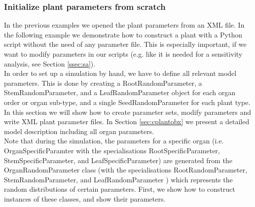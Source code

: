 \subsubsection*{Initialize plant parameters from scratch} 
 
In the previous examples we opened the plant parameters from an XML file. In the following example we demonstrate how to construct a plant with a Python script without the need of any parameter file. This is especially important, if we want to modify parameters in our scripts (e.g. like it is needed for a sensitivity analysis, see Section \ref{ssec:sa}). \\

In order to set up a simulation by hand, we have to define all relevant model parameters. This is done by creating a RootRandomParameter, a StemRandomParameter, and a LeafRandomParameter object for each organ order or organ sub-type, and a single SeedRandomParameter for each plant type. In this section we will show how to create parameter sets, modify parameters and write XML plant parameter files. In Section \ref{sec:cplantobx} we present a detailed model description including all organ parameters. \\

Note that during the simulation, the parameters for a specific organ (i.e. OrganSpecificParamter with the specialisations RootSpecificParameter, StemSpecificParameter, and LeafSpecificParameter) are generated from the OrganRandomParameter class (with the specialisations RootRandomParameter, StemRandomParameter, and LeafRandomParameter ) which represents the random distributions of certain parameters. First, we show how to construct instances of these classes, and show their parameters. \\







